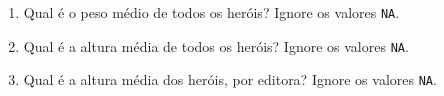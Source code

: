 \documentclass[
  11pt]{report}
\begin{document}
\begin{enumerate}

\item
  Qual é o peso médio de todos os heróis? Ignore os valores \texttt{NA}.

\item
  Qual é a altura média de todos os heróis? Ignore os valores \texttt{NA}.

\item
  Qual é a altura média dos heróis, por editora? Ignore os valores \texttt{NA}.


\end{enumerate}
\end{document}
